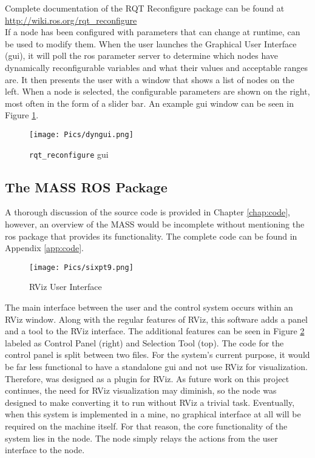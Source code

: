 Complete documentation of the RQT Reconfigure package can be found at \url{http://wiki.ros.org/rqt_reconfigure}\\

If a node has been configured with parameters that can change at runtime,  can be used to modify them. When the user launches the Graphical User Interface (\acrshort{gui}), it will poll the \acrshort{ros} parameter server to determine which nodes have dynamically reconfigurable variables and what their values and acceptable ranges are. It then presents the user with a window that shows a list of nodes on the left. When a node is selected, the configurable parameters are shown on the right, most often in the form of a slider bar. An example  \acrshort{gui} window can be seen in Figure \ref{fig:dyngui2}.

\begin{figure}[h]
    \centering
    \texttt{[image: Pics/dyngui.png]}
    \caption{\texttt{rqt\_reconfigure} \acrshort{gui}}
    \label{fig:dyngui2}
\end{figure}

\subsection{The MASS ROS Package}
\label{sub:software}

A thorough discussion of the source code is provided in Chapter \ref{chap:code}, however, an overview of the MASS would be incomplete without mentioning the \acrshort{ros} package that provides its functionality. The complete code can be found in Appendix \ref{app:code}.\\ 

\begin{figure}[H]
    \centering
    \texttt{[image: Pics/sixpt9.png]}
    \caption{RViz User Interface}
    \label{fig:panel}
\end{figure}

The main interface between the user and the control system occurs within an RViz window. Along with the regular features of RViz, this software adds a panel and a tool to the RViz interface. The additional features can be seen in Figure \ref{fig:panel} labeled as Control Panel (right) and Selection Tool (top). The code for the control panel is split between two files. For the system's current purpose, it would be far less functional to have a standalone \acrshort{gui} and not use RViz for visualization. Therefore,  was designed as a plugin for RViz. As future work on this project continues, the need for RViz visualization may diminish, so the node was designed to make converting it to run without RViz a trivial task. Eventually, when this system is implemented in a mine, no graphical interface at all will be required on the machine itself. For that reason, the core functionality of the system lies in the  node. The  node simply relays the actions from the user interface to the  node.\\

